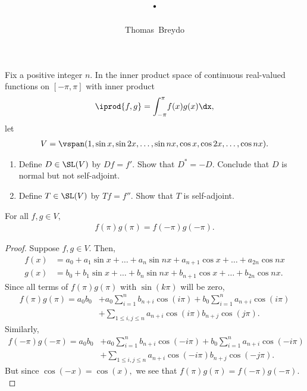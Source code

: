\documentclass{amsart}
\title{\pagenum.\probnum}
\author{Thomas\ Breydo}
\begin{document}
\maketitle

\begin{problem*}
Fix a positive integer $n.$ In the inner product space of
continuous real-valued functions on $[-\pi, \pi]$ with inner
product
\begin{align*}
    \iprod{f,g}=\int_{-\pi}^\pi{\!f(x)g(x)\dx},
\end{align*}
let
\begin{align*}
    V=\vspan(1,\sin x,\sin 2x,\dots,\sin nx,\cos x,\cos 2x,\dots,\cos nx).
\end{align*}
\begin{enumerate}[label=(\alph*),itemsep=1em,topsep=1em]
    \item  Define $D\in\SL(V)$ by $Df=f'.$ Show that $D^*=-D.$
        Conclude that $D$ is normal but not self-adjoint.
    \item Define $T\in\SL(V)$ by $Tf=f''.$ Show that $T$ is
        self-adjoint.
\end{enumerate}
\end{problem*}
\vspace{0.5in}

\begin{claim*}
For all $f,g\in V,$
\begin{align*}
    f(\pi)g(\pi)=f(-\pi)g(-\pi).
\end{align*}
\end{claim*}
\begin{proof}
Suppose $f,g\in V.$ Then,
\begin{align*}
    f(x) &= a_0+a_1\sin x+\dots+a_n\sin nx+a_{n+1}\cos x+\dots+a_{2n}\cos nx \\
    g(x) &= b_0+b_1\sin x+\dots+b_n\sin nx+b_{n+1}\cos x+\dots+b_{2n}\cos nx.
\end{align*}
Since all terms of $f(\pi)g(\pi)$ with $\sin(k\pi)$ will be zero,
\begin{align*}
    f(\pi)g(\pi)= a_0b_0 &+ a_0\sum_{i=1}^n b_{n+i}\cos(i\pi)
    + b_0\sum_{i=1}^n a_{n+i}\cos(i\pi)\\
            &+\sum_{1\le i,j\le n}
            a_{n+i}\cos(i\pi)b_{n+j}\cos(j\pi).
\end{align*} 
Similarly,
\begin{align*}
    f(-\pi)g(-\pi)= a_0b_0 &+ a_0\sum_{i=1}^n b_{n+i}\cos(-i\pi)
    + b_0\sum_{i=1}^n a_{n+i}\cos(-i\pi)\\
            &+\sum_{1\le i,j\le n}
            a_{n+i}\cos(-i\pi)b_{n+j}\cos(-j\pi).
\end{align*}
But since $\cos(-x)=\cos(x),$ we see that
$f(\pi)g(\pi)=f(-\pi)g(-\pi).$
\end{proof}
\end{document}

